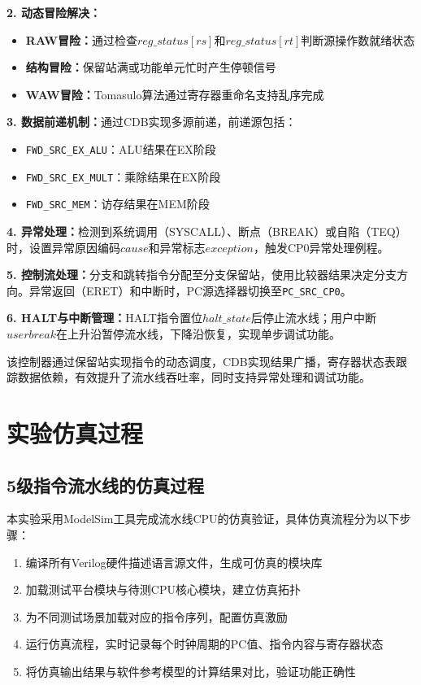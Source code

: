 \documentclass[12pt,a4paper]{article}
\begin{document}
\textbf{2. 动态冒险解决：}
\begin{itemize}
    \item \textbf{RAW冒险：}通过检查$reg\_status[rs]$和$reg\_status[rt]$判断源操作数就绪状态
    \item \textbf{结构冒险：}保留站满或功能单元忙时产生停顿信号
    \item \textbf{WAW冒险：}Tomasulo算法通过寄存器重命名支持乱序完成
\end{itemize}

\textbf{3. 数据前递机制：}通过CDB实现多源前递，前递源包括：
\begin{itemize}
    \item \texttt{FWD\_SRC\_EX\_ALU}：ALU结果在EX阶段
    \item \texttt{FWD\_SRC\_EX\_MULT}：乘除结果在EX阶段  
    \item \texttt{FWD\_SRC\_MEM}：访存结果在MEM阶段
\end{itemize}

\textbf{4. 异常处理：}检测到系统调用（SYSCALL）、断点（BREAK）或自陷（TEQ）时，设置异常原因编码$cause$和异常标志$exception$，触发CP0异常处理例程。

\textbf{5. 控制流处理：}分支和跳转指令分配至分支保留站，使用比较器结果决定分支方向。异常返回（ERET）和中断时，PC源选择器切换至\texttt{PC\_SRC\_CP0}。

\textbf{6. HALT与中断管理：}HALT指令置位$halt\_state$后停止流水线；用户中断$userbreak$在上升沿暂停流水线，下降沿恢复，实现单步调试功能。

该控制器通过保留站实现指令的动态调度，CDB实现结果广播，寄存器状态表跟踪数据依赖，有效提升了流水线吞吐率，同时支持异常处理和调试功能。
\section{实验仿真过程}

\subsection{5级指令流水线的仿真过程}

本实验采用ModelSim工具完成流水线CPU的仿真验证，具体仿真流程分为以下步骤：

\begin{enumerate}
\item 编译所有Verilog硬件描述语言源文件，生成可仿真的模块库
\item 加载测试平台模块与待测CPU核心模块，建立仿真拓扑
\item 为不同测试场景加载对应的指令序列，配置仿真激励
\item 运行仿真流程，实时记录每个时钟周期的PC值、指令内容与寄存器状态
\item 将仿真输出结果与软件参考模型的计算结果对比，验证功能正确性
\end{enumerate}
\end{document}
